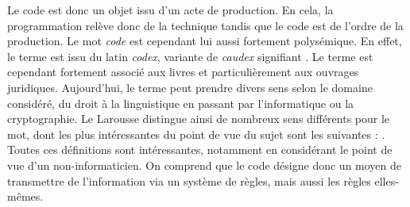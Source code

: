 \documentclass[12pt]{article} %
\begin{document}
Le code est donc un objet issu d'un acte de production. En cela, la programmation relève donc de la technique tandis que le code est de l'ordre de la production. Le mot \textit{code} est cependant lui aussi fortement polysémique. En effet, le terme est issu du latin \textit{codex}, variante de \textit{caudex} signifiant . Le terme est cependant fortement associé aux livres et particulièrement aux ouvrages juridiques. Aujourd'hui, le terme peut prendre divers sens selon le domaine considéré, du droit à la linguistique en passant par l'informatique ou la cryptographie. Le Larousse distingue ainsi de nombreux sens différents pour le mot, dont les plus intéressantes du point de vue du sujet sont les suivantes :
\cite{Nimmo2017-ya}. Toutes ces définitions sont intéressantes, notamment en considérant le point de vue d'un non-informaticien. On comprend que le code désigne donc un moyen de transmettre de l'information via un système de règles, mais aussi les règles elles-mêmes. 
\end{document}
